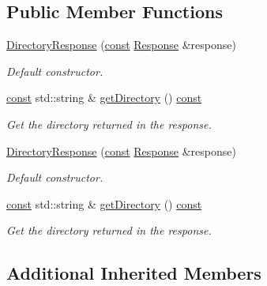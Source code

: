 \subsection*{Public Member Functions}
\begin{DoxyCompactItemize}
\item 
\hyperlink{classsf_1_1_ftp_1_1_directory_response_a36b6d2728fa53c4ad37b7a6307f4d388}{Directory\-Response} (\hyperlink{term__entry_8h_a57bd63ce7f9a353488880e3de6692d5a}{const} \hyperlink{classsf_1_1_ftp_1_1_response}{Response} \&response)
\begin{DoxyCompactList}\small\item\em Default constructor. \end{DoxyCompactList}\item 
\hyperlink{term__entry_8h_a57bd63ce7f9a353488880e3de6692d5a}{const} std\-::string \& \hyperlink{classsf_1_1_ftp_1_1_directory_response_a500793778ad0ed223aa86ed8fbee28a3}{get\-Directory} () \hyperlink{term__entry_8h_a57bd63ce7f9a353488880e3de6692d5a}{const} 
\begin{DoxyCompactList}\small\item\em Get the directory returned in the response. \end{DoxyCompactList}\item 
\hyperlink{classsf_1_1_ftp_1_1_directory_response_a36b6d2728fa53c4ad37b7a6307f4d388}{Directory\-Response} (\hyperlink{term__entry_8h_a57bd63ce7f9a353488880e3de6692d5a}{const} \hyperlink{classsf_1_1_ftp_1_1_response}{Response} \&response)
\begin{DoxyCompactList}\small\item\em Default constructor. \end{DoxyCompactList}\item 
\hyperlink{term__entry_8h_a57bd63ce7f9a353488880e3de6692d5a}{const} std\-::string \& \hyperlink{classsf_1_1_ftp_1_1_directory_response_a500793778ad0ed223aa86ed8fbee28a3}{get\-Directory} () \hyperlink{term__entry_8h_a57bd63ce7f9a353488880e3de6692d5a}{const} 
\begin{DoxyCompactList}\small\item\em Get the directory returned in the response. \end{DoxyCompactList}\end{DoxyCompactItemize}
\subsection*{Additional Inherited Members}



